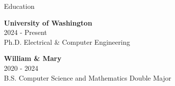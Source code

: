 \begin{rSection}{Education}

{\textbf {University of Washington} }
\\ 2024 - Present
\\ Ph.D. Electrical \& Computer Engineering

{\textbf {William \& Mary} }
\\ 2020 - 2024
\\ B.S. Computer Science and Mathematics Double Major

\end{rSection}
